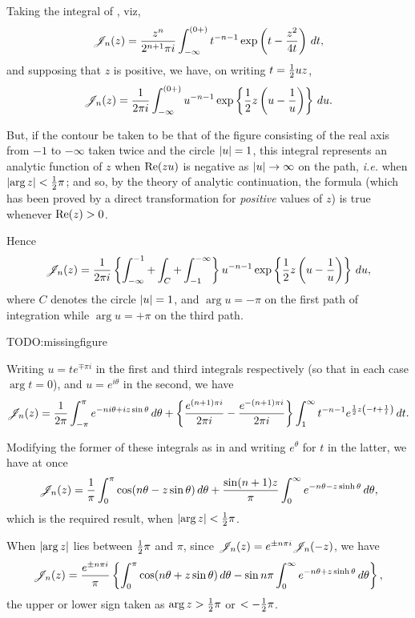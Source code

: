 \documentclass{book}
\begin{document}
Taking the integral of , viz,
$$
\mathscr{J}_n(z) 
=
\frac{z^n}{2^{n+1}\pi i}
\int_{-\infty}^{(0+)}
t^{-n-1}
\exp\left(  t - \frac{z^2}{4t}   \right)
\, d t,
$$
%
%
and supposing that $z$ is positive, we have, on writing
$t = \frac{1}{2} u z$,
$$
\mathscr{J}_n(z) 
= 
\frac{1}{2\pi i} 
\int_{-\infty}^{(0+)}
u^{-n-1}
\exp \left\{  \frac{1}{2} z \left(  u - \frac{1}{u}   \right)   \right\}
\, d u.
$$

But, if the contour be taken to be that of the figure consisting of
the real axis from $-1$ to $-\infty$ taken twice and the circle 
$\left| u \right| = 1$, this integral represents an analytic function of $z$
when $\mathrm{Re}(zu)$ is negative as
$\left| u \right| \rightarrow \infty$ on the path, \emph{i.e.} when 
$\left|  \arg z  \right| < \frac{1}{2} \pi$; and so, by the theory of analytic
continuation, the formula (which has been proved by a direct
transformation for \emph{positive} values of $z$) is true whenever 
$\mathrm{Re}(z) > 0$.

Hence
$$
\mathscr{J}_n(z)
=
\frac{1}{2\pi i}
\left\{ 
  \int_{-\infty}^{-1}
  +
  \int_C
  +
  \int_{-1}^{-\infty}
 \right\}
u^{-n-1}
\exp\left\{  \frac{1}{2} z \left(  u - \frac{1}{u}   \right)   \right\}
\, d u,
$$
where $C$ denotes the circle $\left| u \right| = 1$, and 
$\arg u = -\pi$ on the first path of integration while 
$\arg u = +\pi$ on the third path.

TODO:missingfigure

Writing $u = t e^{\mp \pi i}$ in the first and third integrals
respectively (so that in each case $\arg t = 0$), and 
$u = e^{i\theta}$ in the second, we have
$$
\mathscr{J}_n(z) 
=
\frac{1}{2\pi}
\int_{-\pi}^{\pi}
e^{-ni\theta + iz\sin\theta}
\, d \theta
+
\left\{ 
  \frac{e^{(n+1)\pi i}}{2\pi i}
  -
  \frac{e^{-(n+1)\pi i}}{2\pi i}
 \right\}
\int_1^{\infty}
t^{-n-1}
e^{\frac{1}{2} z \left( -t + \frac{1}{t} \right)}
\, d t.
$$

Modifying the former of these integrals as in
 and writing 
$e^{\theta}$ for $t$ in the latter, we have at once
$$
\mathscr{J}_n(z)
=
\frac{1}{\pi}
\int_0^{\pi}
\cos(n\theta - z\sin\theta)
\, d\theta
+
\frac{\sin(n+1)z}{\pi}
\int_0^{\infty}
e^{-n\theta - z\sinh\theta}
\, d \theta,
$$
which is the required result, when
$\left| \arg z \right| < \frac{1}{2} \pi$.

When $\left|  \arg z  \right|$ lies between $\frac{1}{2} \pi$ and $\pi$, since 
$\mathscr{J}_n(z) = e^{\pm n\pi i} \mathscr{J}_n(-z)$, we have
\begin{equation}
  \mathscr{J}_n(z)
  =
  \frac{e^{\pm n \pi i}}{\pi}
  \left\{ 
    \int_0^{\pi} \cos(n\theta + z\sin\theta) \, d\theta
    -
    \sin n\pi \int_0^{\infty} e^{-n\theta + z\sinh\theta} \, d\theta
     \right\},
\end{equation}
the upper or lower sign taken as
$\arg z > \frac{1}{2} \pi$ or $< -\frac{1}{2} \pi$.
\end{document}
